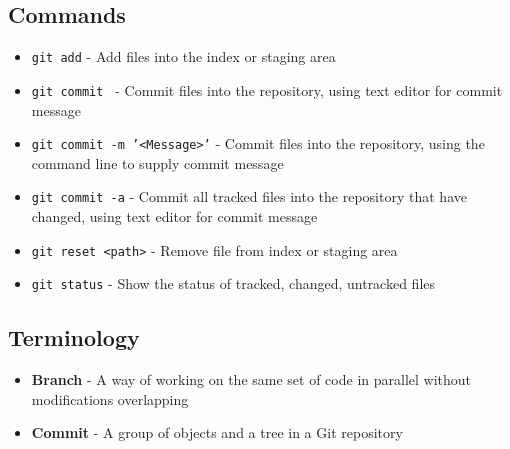 \subsection{Commands}
\begin{itemize}
\item\texttt{git add} - Add files into the index or staging area

\item\texttt{git commit } - Commit files into the repository, using text editor for commit message

\item\texttt{git commit -m '<Message>'} - Commit files into the repository, using the command line to supply commit message

\item\texttt{git commit -a} - Commit all tracked files into the repository that have changed, using text editor for commit message

\item\texttt{git reset <path>} - Remove file from index or staging area

\item\texttt{git status} - Show the status of tracked, changed, untracked files
\end{itemize}

\subsection{Terminology}
\begin{itemize}
\item\textbf{Branch} - A way of working on the same set of code in parallel without modifications overlapping

\item\textbf{Commit} - A group of objects and a tree in a Git repository
\end{itemize}
